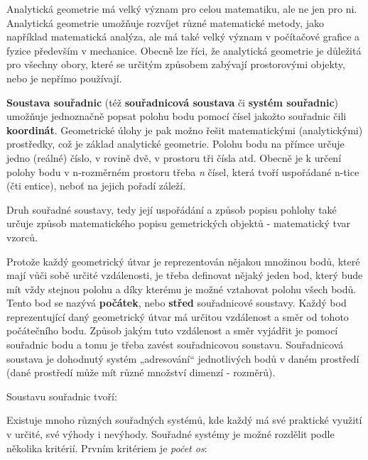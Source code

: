 Analytická geometrie má velký význam pro celou matematiku, ale ne jen pro ni. Analytická geometrie umožňuje rozvíjet různé matematické metody, jako například matematická analýza, ale má také velký význam v počítačové grafice a fyzice především v mechanice. Obecně lze říci, že analytická geometrie je důležitá pro všechny obory, které se určitým způsobem zabývají prostorovými objekty, nebo je nepřímo používají.


{\bf Soustava souřadnic} (též {\bf souřadnicová soustava} či {\bf systém souřadnic}) umožňuje jednoznačně popsat polohu bodu pomocí čísel jakožto souřadnic čili {\bf koordinát}. Geometrické úlohy je pak možno řešit matematickými (analytickými) prostředky, což je základ analytické geometrie. Polohu bodu na přímce určuje jedno (reálné) číslo, v rovině dvě, v prostoru tři čísla atd. Obecně je k určení polohy bodu v n-rozměrném prostoru třeba {\it n} čísel, která tvoří uspořádané n-tice (čti entice), neboť na jejich pořadí záleží.

Druh souřadné soustavy, tedy její uspořádání a způsob popisu pohlohy také určuje způsob matematického popisu gemetrických objektů - matematický tvar vzorců.

Protože každý geometrický útvar je reprezentován nějakou množinou bodů, které mají vůči sobě určité vzdálenosti, je třeba definovat nějaký jeden bod, který bude mít vždy stejnou polohu a díky kterému je možné vztahovat polohu všech bodů. Tento bod se nazývá {\bf počátek}, nebo {\bf střed} souřadnicové soustavy. Každý bod reprezentující daný geometrický útvar má určitou vzdálenost a směr od tohoto počátečního bodu. Způsob jakým tuto vzdálenost a směr vyjádřit je pomocí souřadnic bodu a tomu je třeba zavést souřadnicovou soustavu. Souřadnicová soustava je dohodnutý systém „adresování“ jednotlivých bodů v daném prostředí (dané prostředí může mít různé množství dimenzí - rozměrů).

Soustavu souřadnic tvoří:

\vskip 4mm
\vskip 4mm

Existuje mnoho různých souřadných systémů, kde každý má své praktické využití v určité, své výhody i nevýhody. Souřadné systémy je možné rozdělit podle několika kritérií. Prvním kritériem je {\it počet os}:

